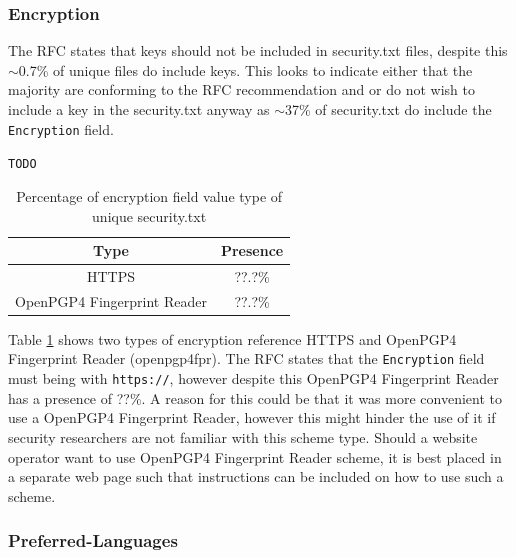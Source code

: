 \documentclass{mscreport}
\begin{document}
\subsubsection{Encryption}

\noindent
The RFC states that keys should not be included in security.txt files, despite this $\sim$0.7\% of unique files do include keys. This looks to indicate either that the majority are conforming to the RFC recommendation and or do not wish to include a key in the security.txt anyway as $\sim$37\% of security.txt do include the \texttt{Encryption} field.

\texttt{TODO}

\begin{table}[H]
  \begin{center}
    \begin{tabular}{|c|c|}  %
      \hline
      \textbf{Type} & \textbf{Presence}\\
      \hline
      HTTPS & ??.?\%\\
      \hline
      OpenPGP4 Fingerprint Reader & ??.?\%\\
      \hline
    \end{tabular}
    \caption{Percentage of encryption field value type of unique security.txt}
    \label{table:security_txt_encryption_type} %
  \end{center}
\end{table}

\noindent
Table \ref{table:security_txt_encryption_type} shows two types of encryption reference HTTPS and 
 OpenPGP4 Fingerprint Reader (openpgp4fpr). The RFC states that the \texttt{Encryption} field must being with \texttt{https://}, however despite this OpenPGP4 Fingerprint Reader has a presence of ??\%. A reason for this could be that it was more convenient to use a OpenPGP4 Fingerprint Reader, however this might hinder the use of it if security researchers are not familiar with this scheme type. Should a website operator want to use OpenPGP4 Fingerprint Reader scheme, it is best placed in a separate web page such that instructions can be included on how to use such a scheme.


\subsubsection{Preferred-Languages}
\end{document}
